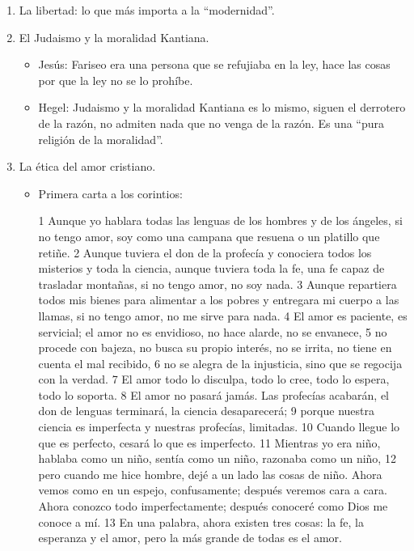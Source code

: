 \begin{enumerate}
\begin{enumerate}
            \item La libertad: lo que más importa a la ``modernidad''.
                

            \item El Judaismo y la moralidad Kantiana. 
                \begin{itemize}
                    \item Jesús: Fariseo era una persona que se refujiaba en la ley, hace las cosas por que la ley no se lo prohíbe.  
                    \item Hegel: Judaismo y la moralidad Kantiana es lo mismo, siguen el derrotero de la razón, no admiten nada que no venga de la razón. Es una ``pura religión de la moralidad''.
                \end{itemize}

            \item La ética del amor cristiano.
                \begin{itemize}
                    \item Primera carta a los corintios:
                        \par
                        {
                            1 Aunque yo hablara todas las lenguas de los hombres y de los ángeles, si no tengo amor, soy como una campana que resuena o un platillo que retiñe. 2 Aunque tuviera el don de la profecía y conociera todos los misterios y toda la ciencia, aunque tuviera toda la fe, una fe capaz de trasladar montañas, si no tengo amor, no soy nada. 3 Aunque repartiera todos mis bienes para alimentar a los pobres y entregara mi cuerpo a las llamas, si no tengo amor, no me sirve para nada.
                            4 El amor es paciente, es servicial; el amor no es envidioso, no hace alarde, no se envanece, 5 no procede con bajeza, no busca su propio interés, no se irrita, no tiene en cuenta el mal recibido, 6 no se alegra de la injusticia, sino que se regocija con la verdad. 7 El amor todo lo disculpa, todo lo cree, todo lo espera, todo lo soporta.
                            8 El amor no pasará jamás. Las profecías acabarán, el don de lenguas terminará, la ciencia desaparecerá; 9 porque nuestra ciencia es imperfecta y nuestras profecías, limitadas. 10 Cuando llegue lo que es perfecto, cesará lo que es imperfecto. 11 Mientras yo era niño, hablaba como un niño, sentía como un niño, razonaba como un niño, 12 pero cuando me hice hombre, dejé a un lado las cosas de niño. Ahora vemos como en un espejo, confusamente; después veremos cara a cara. Ahora conozco todo imperfectamente; después conoceré como Dios me conoce a mí. 13 En una palabra, ahora existen tres cosas: la fe, la esperanza y el amor, pero la más grande de todas es el amor.
}
\end{itemize}
\end{enumerate}
\end{enumerate}

